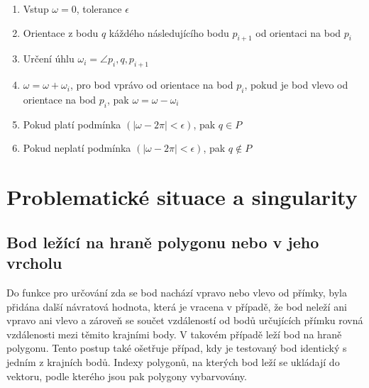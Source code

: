 \documentclass{article}
\begin{document}
\begin{enumerate} 

\item Vstup $\omega = 0$, tolerance $\epsilon$

\item Orientace z bodu $q$ káždého následujícího bodu  $p_{i+1}$ od orientaci na bod $p_i$

\item Určení úhlu $\omega_i = \angle p_i, q, p_{i+1}$ 

\item  $\omega = \omega + \omega_i$, pro bod vprávo od orientace na bod $p_i$, pokud je bod vlevo od orientace na bod $p_i$, pak $\omega = \omega - \omega_i$

\item Pokud platí podmínka $(\left|\omega - 2\pi \right| < \epsilon)$, pak $q \in P$

\item Pokud neplatí podmínka  $(\left|\omega - 2\pi \right| < \epsilon)$, pak $q \notin P$

\end{enumerate} 
\clearpage
\newpage
\section{Problematické situace a singularity} %
\label{singularity}
\subsection{Bod ležící na hraně polygonu nebo v jeho vrcholu} 

\bigskip 

Do funkce pro určování zda se bod nachází vpravo nebo vlevo od přímky, byla přidána další návratová hodnota, která je vracena v případě, že bod neleží ani vpravo ani vlevo a zároveň se součet vzdáleností od bodů určujících přímku rovná vzdálenosti mezi těmito krajními body. V takovém případě leží bod na hraně polygonu. Tento postup také ošetřuje případ, kdy je testovaný bod identický s jedním z krajních bodů. Indexy polygonů, na kterých bod leží se ukládají do vektoru, podle kterého jsou pak polygony vybarvovány. 
\end{document}
